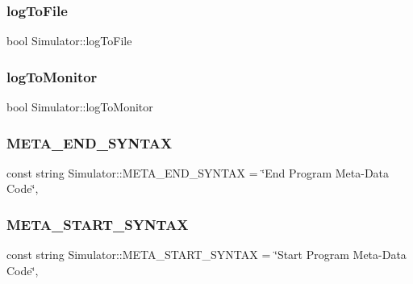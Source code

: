 \subsubsection{\texorpdfstring{log\+To\+File}{logToFile}}
{\footnotesize\ttfamily bool Simulator\+::log\+To\+File\hspace{0.3cm}{\ttfamily [private]}}

\hypertarget{class_simulator_a7ae7d7fc57479dad16e8aab5397da7ce}{}\label{class_simulator_a7ae7d7fc57479dad16e8aab5397da7ce} 
\subsubsection{\texorpdfstring{log\+To\+Monitor}{logToMonitor}}
{\footnotesize\ttfamily bool Simulator\+::log\+To\+Monitor\hspace{0.3cm}{\ttfamily [private]}}

\hypertarget{class_simulator_a91ee5a9047af12c49f4db088acb077f2}{}\label{class_simulator_a91ee5a9047af12c49f4db088acb077f2} 
\subsubsection{\texorpdfstring{M\+E\+T\+A\+\_\+\+E\+N\+D\+\_\+\+S\+Y\+N\+T\+AX}{META\_END\_SYNTAX}}
{\footnotesize\ttfamily const string Simulator\+::\+M\+E\+T\+A\+\_\+\+E\+N\+D\+\_\+\+S\+Y\+N\+T\+AX = \char`\"{}End Program Meta-\/Data Code\char`\"{}\hspace{0.3cm}{\ttfamily [static]}, {\ttfamily [private]}}

\hypertarget{class_simulator_ada63d5f4468a4265417286a0fb4ec0bb}{}\label{class_simulator_ada63d5f4468a4265417286a0fb4ec0bb} 
\subsubsection{\texorpdfstring{M\+E\+T\+A\+\_\+\+S\+T\+A\+R\+T\+\_\+\+S\+Y\+N\+T\+AX}{META\_START\_SYNTAX}}
{\footnotesize\ttfamily const string Simulator\+::\+M\+E\+T\+A\+\_\+\+S\+T\+A\+R\+T\+\_\+\+S\+Y\+N\+T\+AX = \char`\"{}Start Program Meta-\/Data Code\char`\"{}\hspace{0.3cm}{\ttfamily [static]}, {\ttfamily [private]}}

